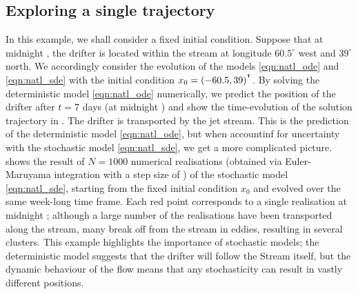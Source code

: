 


\subsection{Exploring a single trajectory}
In this example, we shall consider a fixed initial condition.
Suppose that at midnight , the drifter is located within the stream  at longitude \(60.5^\circ\) west and \(39^\circ\) north.
We accordingly consider the evolution of the models \cref{eqn:natl_ode} and \cref{eqn:natl_sde} with the initial condition \(x_0 = (-60.5, 39)^{^{\intercal}}\).
By solving the deterministic model \cref{eqn:natl_ode} numerically, we predict the position of the drifter after \(t = 7\) days (at midnight ) and show the time-evolution of the solution trajectory in .
The drifter is transported by the jet stream.
This is the prediction of the deterministic model \cref{eqn:natl_ode}, but when accountinf for uncertainty with the stochastic model \cref{eqn:natl_sde}, we get a more complicated picture.
 shows the result of \(N = 1000\) numerical realisations (obtained via Euler-Maruyama integration with a step size of ) of the stochastic model \cref{eqn:natl_sde}, starting from the fixed initial condition \(x_0\) and evolved over the same week-long time frame.
Each red point corresponds to a single realisation at midnight ; although a large number of the realisations have been transported along the stream, many break off from the stream in eddies, resulting in several clusters.
This example highlights the importance of stochastic models; the deterministic model suggests that the drifter will follow the Stream itself, but the dynamic behaviour of the flow means that any stochasticity can result in vastly different positions.


